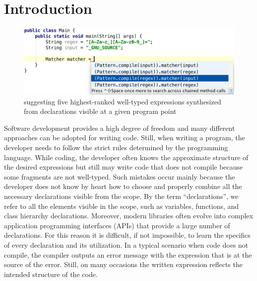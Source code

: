\section{Introduction}
\label{sec:intro}

\begin{figure}[!tbh]
\includegraphics[natwidth=\textwidth]{RegexMatcher.png}
\caption{{\ourTool} suggesting five highest-ranked 
well-typed expressions synthesized from declarations visible at a given program point\label{fig:screenshot1}}
\end{figure}


Software development provides a high degree of freedom and many different approaches can be adopted for writing code. Still, when writing a program, the developer needs to follow the strict rules determined by the programming language. While coding, the developer often knows the approximate structure of the desired expressions but still may write code that does not compile because some fragments are not well-typed. Such mistakes occur mainly because the developer does not know by heart how to choose and properly combine all the necessary declarations visible from the scope. By the term ``declarations'', we refer to all the elements visible in the scope, such as variables, functions, and class hierarchy declarations. Moreover, modern libraries often evolve into complex application programming interfaces (APIs) that provide a large number of declarations. For this reason it is difficult, if not impossible, to learn the specifics of every declaration and its utilization. In a typical scenario when code does not compile, the compiler outputs an error message with the expression that is at the source of the error. Still, on many occasions the written expression reflects the intended structure of the code. 

